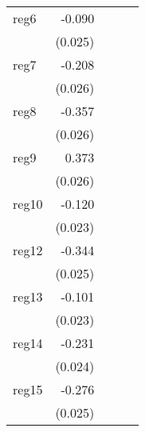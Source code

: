 {\begin{longtable}{l*{4}{D{.}{.}{-1}}}
\addlinespace
reg6        &      -0.090\sym{***}&                     &                     &                     \\
            &     (0.025)         &                     &                     &                     \\
\addlinespace
reg7        &      -0.208\sym{***}&                     &                     &                     \\
            &     (0.026)         &                     &                     &                     \\
\addlinespace
reg8        &      -0.357\sym{***}&                     &                     &                     \\
            &     (0.026)         &                     &                     &                     \\
\addlinespace
reg9        &       0.373\sym{***}&                     &                     &                     \\
            &     (0.026)         &                     &                     &                     \\
\addlinespace
reg10       &      -0.120\sym{***}&                     &                     &                     \\
            &     (0.023)         &                     &                     &                     \\
\addlinespace
reg12       &      -0.344\sym{***}&                     &                     &                     \\
            &     (0.025)         &                     &                     &                     \\
\addlinespace
reg13       &      -0.101\sym{***}&                     &                     &                     \\
            &     (0.023)         &                     &                     &                     \\
\addlinespace
reg14       &      -0.231\sym{***}&                     &                     &                     \\
            &     (0.024)         &                     &                     &                     \\
\addlinespace
reg15       &      -0.276\sym{***}&                     &                     &                     \\
            &     (0.025)         &                     &                     &                     \\

\end{longtable}}
